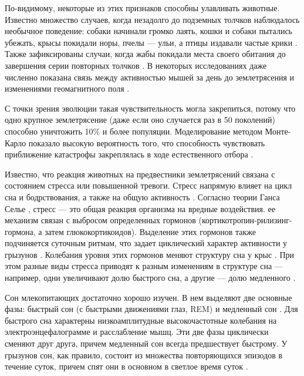 \documentclass[14pt]{mmcs_article}
\begin{document}
По-видимому, некоторые из этих признаков способны улавливать животные. Известно множество случаев, когда незадолго до подземных толчков наблюдалось необычное поведение: собаки начинали громко лаять, кошки и собаки пытались убежать, крысы покидали норы, пчелы — ульи, а птицы издавали частые крики \cite{Kirschvink2000}. Также зафиксированы случаи, когда жабы покидали места своего обитания до завершения серии повторных толчков \cite{Grant2011}. В некоторых исследованиях даже численно показана связь между активностью мышей за день до землетрясения и изменениями геомагнитного поля \cite{Yokoi2003}.

С точки зрения эволюции такая чувствительность могла закрепиться, потому что одно крупное землетрясение (даже если оно случается раз в 50 поколений) способно уничтожить 10\% и более популяции. Моделирование методом Монте-Карло показало высокую вероятность того, что способность чувствовать приближение катастрофы закреплялась в ходе естественного отбора \cite{Kirschvink2000}.

Известно, что реакция животных на предвестники землетрясений связана с состоянием стресса или повышенной тревоги. Стресс напрямую влияет на цикл сна и бодрствования, а также на общую активность \cite{Rampin1991, Meerlo1997, Palma2000, Adrien1991}. Согласно теории Ганса Селье \cite{Selye1950}, стресс — это общая реакция организма на вредные воздействия. ее механизм связан с выбросом определенных гормонов (кортикотропин-рилизинг-гормона, а затем глюкокортикоидов). Выделение этих гормонов также подчиняется суточным ритмам, что задает циклический характер активности у грызунов \cite{Herman2016, Kalsbeek2012}. Колебания уровня этих гормонов меняют структуру сна у крыс \cite{Bradbury1998}. При этом разные виды стресса приводят к разным изменениям в структуре сна — например, одни увеличивают долю быстрого сна, а другие — долю медленного \cite{Rampin1991, Meerlo1997, Palma2000, Adrien1991, Sanford2010}.

Сон млекопитающих достаточно хорошо изучен. В нем выделяют две основные фазы: быстрый сон (с быстрыми движениями глаз, REM) и медленный сон \cite{Rytkonen2011, Saevskiy2025, Kostin2019, Vyazovskiy2005, Lyamin2008}. Для быстрого сна характерны низкоамплитудные высокочастотные колебания на электроэнцефалограмме и расслабление мышц. Эти две фазы циклически сменяют друг друга, причем медленный сон всегда предшествует быстрому. У грызунов сон, как правило, состоит из множества повторяющихся эпизодов в течение суток, причем спят они в основном в светлое время суток \cite{Franken1991, WeberDan2016}.
\end{document}
